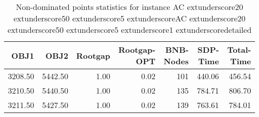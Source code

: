 \begin{table}
\caption{Non-dominated points statistics for instance AC	extunderscore20	extunderscore50	extunderscore5	extunderscoreAC	extunderscore20	extunderscore50	extunderscore5	extunderscore1	extunderscoredetailed}
\label{tab:stats/AC_20_50_5_AC_20_50_5_1_detailed}
\begin{tabular}{rrrrrrr}
\toprule
OBJ1 & OBJ2 & Rootgap & Rootgap-OPT & BNB-Nodes & SDP-Time & Total-Time \\
\midrule
3208.50 & 5442.50 & 1.00 & 0.02 & 101 & 440.06 & 456.54 \\
3210.50 & 5440.50 & 1.00 & 0.02 & 135 & 784.71 & 806.70 \\
3211.50 & 5427.50 & 1.00 & 0.02 & 139 & 763.61 & 784.01 \\
\bottomrule
\end{tabular}
\end{table}
